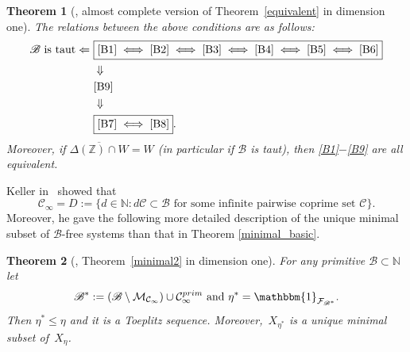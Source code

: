 \documentclass[leqno,a4paper,12pt]{article}
\newtheorem{Th}{Theorem}[section]
\theoremstyle{definition}
\newcommand{\N}{{\mathbb{N}}}
\newcommand{\cC}{\mathcal{C}}
\newcommand{\sB}{\mathscr{B}}
\newcommand{\raz}{\mathbbm{1}}
\begin{document}
\begin{Th}[{\cite[Theorem B]{MR3947636}}, almost complete version of Theorem~\ref{equivalent} in dimension one]
The relations between the above conditions are as follows:
\begin{align*}
\text{$\mathscr{B}$ is taut}\Leftarrow\ &\boxed{\eqref{B1}\iff\eqref{B2}\iff\eqref{B3}\iff\eqref{B4}\iff\eqref{B5}\iff\eqref{B6}}\\
&\Downarrow\\
& \eqref{B9}\\
& \Downarrow\\
&\boxed{\eqref{B7}\iff\eqref{B8}}.
\end{align*}
Moreover, if $\overline{\Delta(\mathbb{Z}) \cap W}=W$ (in particular if $\sB$ is taut), then \eqref{B1}$-$\eqref{B9} are all equivalent.
\end{Th}
Keller in~\cite[Lemma 1]{MR4280951} showed that
\begin{equation}\label{de}
\mathcal{C}_\infty=D:=\{d\in\N :  d\cC\subset\sB \text{ for some infinite pairwise coprime set }\cC\}.
\end{equation}
Moreover, he gave the following more detailed description of the unique minimal subset of $\sB$-free systems than that in Theorem \ref{minimal_basic}.
\begin{Th}[{\cite[Corollary 5, Lemma 3]{MR4280951}}, Theorem~\ref{minimal2} in dimension one]\label{min_Keller}
For any primitive $\sB\subset\N$ let
\[
\sB^{*}:=(\sB \setminus \mathcal{M}_{\mathcal{C}_{\infty}})\cup \mathcal{C}_{\infty}^{prim}\text{ and } \eta^{*}=\raz_{\mathcal{F}_{\mathscr{B}^{*}}}.
\]
Then $\eta^{*}\leq \eta$ and it is a Toeplitz sequence. Moreover,~$X_{\eta^*}$ is a unique minimal subset of~$X_\eta$.
\end{Th}
\end{document}

